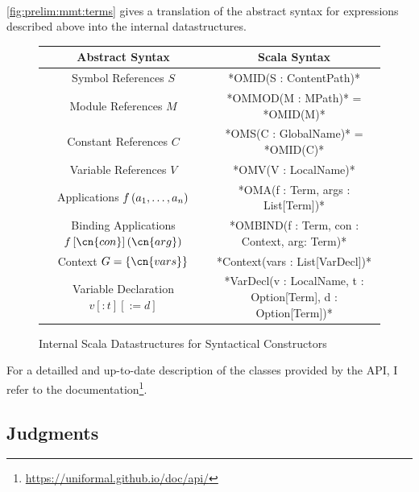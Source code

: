 \paragraph{} \autoref{fig:prelim:mmt:terms} gives a translation of the abstract syntax for expressions described above into the internal datastructures.
\begin{figure}[ht]\begin{center}\smaller
\begin{tabular}{c|c}
\textbf{Abstract Syntax} & \textbf{Scala Syntax} \\\hline\hline
Symbol References $S$ & *OMID(S : ContentPath)*  \\
Module References $M$ & *OMMOD(M : MPath)* = *OMID(M)*  \\
Constant References $C$ & *OMS(C : GlobalName)* = *OMID(C)*  \\
Variable References $V$ & *OMV(V : LocalName)*  \\\hline
Applications $f\left(a_1,\ldots,a_n\right)$ & *OMA(f : Term, args : List[Term])* \\
Binding Applications $\ombind f{\cn{con}}{\cn{arg}}$ & *OMBIND(f : Term, con : Context, arg: Term)* \\\hline
Context $G=\{\cn{vars}\}$ & *Context(vars : List[VarDecl])* \\
Variable Declaration $v[:t][:=d]$ & *VarDecl(v : LocalName, t : Option[Term], d : Option[Term])* \\ 
\end{tabular}\end{center}
\caption{Internal Scala Datastructures for \mmt Syntactical Constructors}\label{fig:prelim:mmt:terms}
\end{figure}

For a detailled and up-to-date description of the classes provided by the \mmt API, I refer to the \mmt documentation\footnote{\url{https://uniformal.github.io/doc/api/}}.


\subsection{Judgments}\label{sec:prelim:notation:judg}

